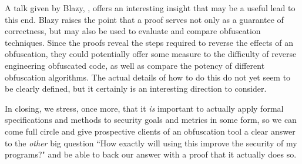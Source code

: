 \documentclass[12pt,notitlepage]{report}
\theoremstyle{plain}
\theoremstyle{definition}
\numberwithin{equation}{section}
\begin{document}
\par A talk given by Blazy, \cite{BlazyTalk}, offers an interesting insight that may be a useful lead to this end.  Blazy raises the point that a proof serves not only as a guarantee of correctness, but may also be used to evaluate and compare obfuscation techniques.  Since the proofs reveal the steps required to reverse the effects of an obfuscation, they could potentially offer some measure to the difficulty of reverse engineering obfuscated code, as well as compare the potency of different obfuscation algorithms.  The actual details of how to do this do not yet seem to be clearly defined, but it certainly is an interesting direction to consider.

\par In closing, we stress, once more, that it \emph{is} important to actually apply formal specifications and methods to security goals and metrics in some form, so we can come full circle and give prospective clients of an obfuscation tool a clear answer to the \emph{other} big question ``How exactly will using this improve the security of my programs?" and be able to back our answer with a proof that it actually does so.

{}
\printindex




\nocite{HuRy}
\nocite{Wang}
\nocite{Laszlo}
\end{document}
